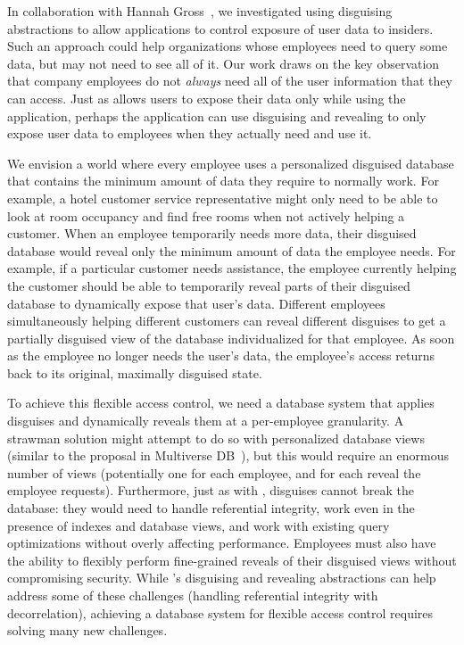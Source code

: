 %
In collaboration with Hannah Gross~\cite{funhouse}, we investigated using
disguising abstractions to allow applications to control exposure of user data
to insiders. Such an approach could help organizations whose employees
need to query some data, but may not need to see all of it.
%
Our work draws on the key observation that company employees do not
\emph{always} need all of the user information that they can access.
%
Just as \sys allows users to expose their data only while using the application,
perhaps the application can use disguising and revealing to only expose user
data to employees when they actually need and use it.
%

%
We envision a world where every employee uses a personalized disguised database
that contains the minimum amount of data they require to normally work. For
example, a hotel customer service representative might only need to be able to
look at room occupancy and find free rooms when not actively helping a customer.
%
%
When an employee temporarily needs more data, their disguised database would
reveal only the minimum amount of data the employee needs. For example, if a
particular customer needs assistance, the employee currently helping the
customer should be able to temporarily reveal parts of their disguised database
to dynamically expose that user's data.
%
Different employees simultaneously helping different customers can reveal
different disguises to get a partially disguised view of the database
individualized for that employee.
%
As soon as the employee no longer needs the user's data, the employee’s access
returns back to its original, maximally disguised state.
%

%
To achieve this flexible access control, we need a database system that applies
disguises and dynamically reveals them at a per-employee granularity.
%
A strawman solution might attempt to do so with personalized database views
(similar to the proposal in Multiverse DB~\cite{multiverse}), but this would
require an enormous number of views (potentially one for each employee, and for
each reveal the employee requests).
%
Furthermore, just as with \sys, disguises cannot break the database: they would
need to handle referential integrity, work even in the presence of indexes and
database views, and work with existing query optimizations without overly
affecting performance.
%
Employees must also have the ability to flexibly perform fine-grained reveals of
their disguised views without compromising security.
%
While \sys's disguising and revealing abstractions can help address some of
these challenges (\eg handling referential integrity with decorrelation),
achieving a database system for flexible access control requires solving many
new challenges.

